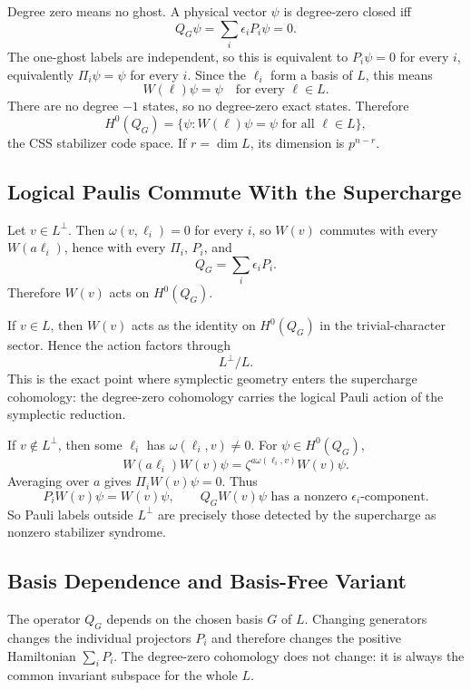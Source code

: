 Degree zero means no ghost. A physical vector \(\psi\) is degree-zero closed
iff
\[
  Q_G\psi=\sum_i\epsilon_iP_i\psi=0.
\]
The one-ghost labels are independent, so this is equivalent to \(P_i\psi=0\)
for every \(i\), equivalently \(\Pi_i\psi=\psi\) for every \(i\). Since the
\(\ell_i\) form a basis of \(L\), this means
\[
  W(\ell)\psi=\psi\quad\text{for every }\ell\in L.
\]
There are no degree \(-1\) states, so no degree-zero exact states. Therefore
\[
  H^0(Q_G)
  =
  \{\psi:W(\ell)\psi=\psi\text{ for all }\ell\in L\},
\]
the CSS stabilizer code space. If \(r=\dim L\), its dimension is \(p^{n-r}\).

\subsection{Logical Paulis Commute With the Supercharge}

Let \(v\in L^\perp\). Then \(\omega(v,\ell_i)=0\) for every \(i\), so \(W(v)\)
commutes with every \(W(a\ell_i)\), hence with every \(\Pi_i\), \(P_i\), and
\[
  Q_G=\sum_i\epsilon_iP_i.
\]
Therefore \(W(v)\) acts on \(H^0(Q_G)\).

If \(v\in L\), then \(W(v)\) acts as the identity on \(H^0(Q_G)\) in the
trivial-character sector. Hence the action factors through
\[
  L^\perp/L.
\]
This is the exact point where symplectic geometry enters the supercharge
cohomology: the degree-zero cohomology carries the logical Pauli action of the
symplectic reduction.

If \(v\notin L^\perp\), then some \(\ell_i\) has \(\omega(\ell_i,v)\neq0\).
For \(\psi\in H^0(Q_G)\),
\[
  W(a\ell_i)W(v)\psi
  =
  \zeta^{a\omega(\ell_i,v)}W(v)\psi .
\]
Averaging over \(a\) gives \(\Pi_iW(v)\psi=0\). Thus
\[
  P_iW(v)\psi=W(v)\psi,
  \qquad
  Q_GW(v)\psi
  \text{ has a nonzero } \epsilon_i\text{-component}.
\]
So Pauli labels outside \(L^\perp\) are precisely those detected by the
supercharge as nonzero stabilizer syndrome.

\subsection{Basis Dependence and Basis-Free Variant}

The operator \(Q_G\) depends on the chosen basis \(G\) of \(L\). Changing
generators changes the individual projectors \(P_i\) and therefore changes the
positive Hamiltonian \(\sum_iP_i\). The degree-zero cohomology does not change:
it is always the common invariant subspace for the whole \(L\).

